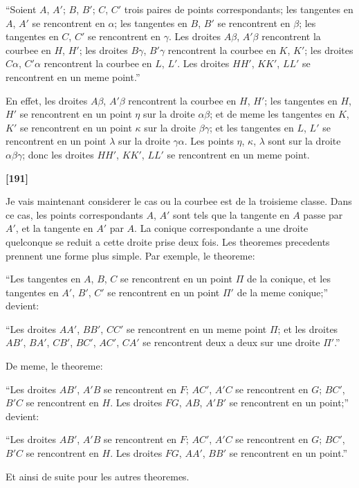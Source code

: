 \documentclass[11pt,a4paper]{article}
\begin{document}
``Soient $A$, $A'$; $B$, $B'$; $C$, $C'$ trois paires de points correspondants; les tangentes
en $A$, $A'$ se rencontrent en $\alpha$; les tangentes en $B$, $B'$ se rencontrent en $\beta$; les tangentes en
$C$, $C'$ se rencontrent en $\gamma$. Les droites $A\beta$, $A'\beta$ rencontrent la courbee en $H$, $H'$; les droites
$B\gamma$, $B'\gamma$ rencontrent la courbee en $K$, $K'$; les droites $C\alpha$, $C'\alpha$ rencontrent la courbee en $L$, $L'$.
Les droites $HH'$, $KK'$, $LL'$ se rencontrent en un meme point.''

En effet, les droites $A\beta$, $A'\beta$ rencontrent la courbee en $H$, $H'$; les tangentes en $H$, $H'$
se rencontrent en un point $\eta$ sur la droite $\alpha\beta$; et de meme les tangentes en $K$, $K'$ se
rencontrent en un point $\kappa$ sur la droite $\beta\gamma$; et les tangentes en $L$, $L'$ se rencontrent en
un point $\lambda$ sur la droite $\gamma\alpha$. Les points $\eta$, $\kappa$, $\lambda$ sont sur la droite $\alpha\beta\gamma$; donc les droites
$HH'$, $KK'$, $LL'$ se rencontrent en un meme point.

\textbf{[191]}

Je vais maintenant considerer le cas ou la courbee est de la troisieme classe. Dans
ce cas, les points correspondants $A$, $A'$ sont tels que la tangente en $A$ passe par $A'$,
et la tangente en $A'$ par $A$. La conique correspondante a une droite quelconque se
reduit a cette droite prise deux fois. Les theoremes precedents prennent une forme
plus simple. Par exemple, le theoreme:

``Les tangentes en $A$, $B$, $C$ se rencontrent en un point $\Pi$ de la conique, et les
tangentes en $A'$, $B'$, $C'$ se rencontrent en un point $\Pi'$ de la meme conique;'' devient:

``Les droites $AA'$, $BB'$, $CC'$ se rencontrent en un meme point $\Pi$; et les droites
$AB'$, $BA'$, $CB'$, $BC'$, $AC'$, $CA'$ se rencontrent deux a deux sur une droite $\Pi'$.''

De meme, le theoreme:

``Les droites $AB'$, $A'B$ se rencontrent en $F$; $AC'$, $A'C$ se rencontrent en $G$; $BC'$,
$B'C$ se rencontrent en $H$. Les droites $FG$, $AB$, $A'B'$ se rencontrent en un point;'' devient:

``Les droites $AB'$, $A'B$ se rencontrent en $F$; $AC'$, $A'C$ se rencontrent en $G$; $BC'$,
$B'C$ se rencontrent en $H$. Les droites $FG$, $AA'$, $BB'$ se rencontrent en un point.''

Et ainsi de suite pour les autres theoremes.
\end{document}
